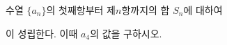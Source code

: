 수열 $\{a_n\}$의 첫째항부터 제$n$항까지의 합 $S_n$에 대하여\par\smallskip{}\par\smallskip\noindent 이 성립한다. 이때 $a_4$의 값을 구하시오.
